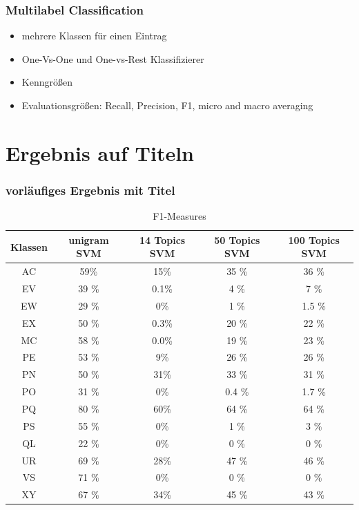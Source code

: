 \documentclass[12pt, xcolor=table]{beamer}
\begin{document}
\begin{frame}
    \frametitle{Multilabel Classification}
    \begin{itemize}
        \item mehrere Klassen für einen Eintrag
        \item One-Vs-One und One-vs-Rest Klassifizierer
        \item Kenngrößen
        \item Evaluationsgrößen: Recall, Precision, F1, micro and macro averaging
    \end{itemize}
\end{frame}

\section{Ergebnis auf Titeln} %
\label{sec:Ergebnis}

\begin{frame}
    \frametitle{vorläufiges Ergebnis mit Titel}
    \begin{center}
    \begin{table}
    \begin{tabular}{c|cccc}
        \tiny\textbf{Klassen} &\tiny \textbf{unigram SVM} &\tiny \textbf{14 Topics SVM} & \tiny \textbf{50 Topics SVM} & \tiny \textbf{100 Topics SVM}\\
        \hline
        \tiny AC &\tiny 59\% &\tiny 15\% &\tiny 35 \% &\tiny 36 \%\\
        \tiny EV &\tiny 39 \% &\tiny 0.1\% &\tiny 4 \% &\tiny 7 \%\\
        \tiny EW &\tiny 29 \% &\tiny 0\% &\tiny 1 \% &\tiny 1.5 \%\\
        \tiny EX &\tiny 50 \% &\tiny 0.3\% &\tiny 20 \% &\tiny 22 \%\\
        \tiny MC &\tiny 58 \% &\tiny 0.0\% &\tiny 19 \% &\tiny 23 \%\\
        \tiny PE &\tiny 53 \% &\tiny 9\% &\tiny 26 \% &\tiny 26 \%\\
        \tiny PN &\tiny 50 \% &\tiny 31\% &\tiny 33 \% &\tiny 31 \%\\
        \tiny PO &\tiny 31 \% &\tiny 0\% &\tiny 0.4 \% &\tiny 1.7 \%\\
        \tiny PQ &\tiny 80 \% &\tiny 60\% &\tiny 64 \% &\tiny 64 \%\\
        \tiny PS &\tiny 55 \% &\tiny 0\% &\tiny 1 \% &\tiny 3 \%\\
        \tiny QL &\tiny 22 \% &\tiny 0\% &\tiny 0 \% &\tiny 0 \%\\
        \tiny UR &\tiny 69 \% &\tiny 28\% &\tiny 47 \% &\tiny 46 \%\\
        \tiny VS &\tiny 71 \% &\tiny 0\% &\tiny 0 \% &\tiny 0 \%\\
        \tiny XY &\tiny 67 \% &\tiny 34\% &\tiny 45 \% &\tiny 43 \%\\
    \end{tabular}
     \caption*{F1-Measures}
    \end{table}
    \end{center}
\end{frame}
\end{document}
